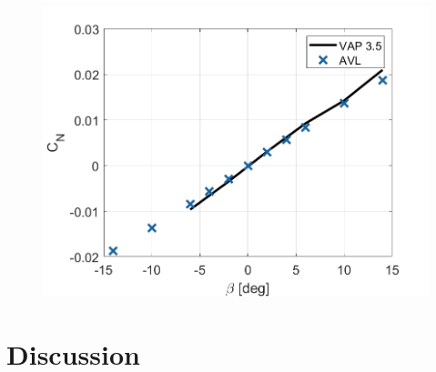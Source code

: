 \begin{figure}
         \centering
         \includegraphics[width=\textwidth]{05_Results/Figs/VAP/genMAV/GenMAVModelValidation3.png}
         \label{fig:genMAV_Cn}
         \caption{}
\end{figure}




\section{Discussion}